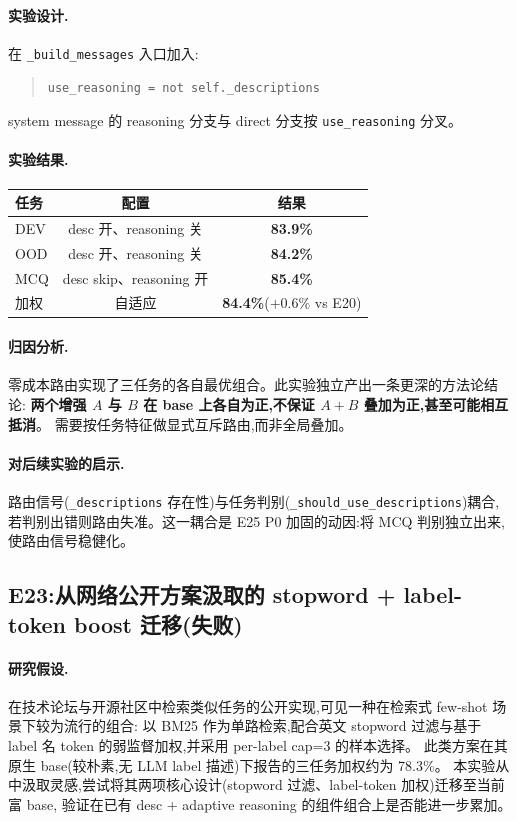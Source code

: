 \documentclass[11pt,a4paper]{ctexart}
\begin{document}
\paragraph{实验设计.}在 \texttt{\_build\_messages} 入口加入:
\begin{quote}
\texttt{use\_reasoning = not self.\_descriptions}
\end{quote}
system message 的 reasoning 分支与 direct 分支按 \texttt{use\_reasoning} 分叉。

\paragraph{实验结果.}

\begin{table}[h]
\centering
\small
\begin{tabular}{lcc}
\toprule
任务 & 配置 & 结果 \\
\midrule
DEV & desc 开、reasoning 关 & \textbf{83.9\%} \\
OOD & desc 开、reasoning 关 & \textbf{84.2\%} \\
MCQ & desc skip、reasoning 开 & \textbf{85.4\%} \\
\midrule
加权 & 自适应 & \textbf{84.4\%}($+0.6\%$ vs E20) \\
\bottomrule
\end{tabular}
\end{table}

\paragraph{归因分析.}零成本路由实现了三任务的各自最优组合。此实验独立产出一条更深的方法论结论:
\textbf{两个增强 $A$ 与 $B$ 在 base 上各自为正,不保证 $A + B$ 叠加为正,甚至可能相互抵消}。
需要按任务特征做显式互斥路由,而非全局叠加。

\paragraph{对后续实验的启示.}路由信号(\texttt{\_descriptions} 存在性)与任务判别(\texttt{\_should\_use\_descriptions})耦合,
若判别出错则路由失准。这一耦合是 E25 P0 加固的动因:将 MCQ 判别独立出来,使路由信号稳健化。

\subsection{E23:从网络公开方案汲取的 stopword + label-token boost 迁移(失败)}

\paragraph{研究假设.}在技术论坛与开源社区中检索类似任务的公开实现,可见一种在检索式 few-shot 场景下较为流行的组合:
以 BM25 作为单路检索,配合英文 stopword 过滤与基于 label 名 token 的弱监督加权,并采用 per-label cap=3 的样本选择。
此类方案在其原生 base(较朴素,无 LLM label 描述)下报告的三任务加权约为 78.3\%。
本实验从中汲取灵感,尝试将其两项核心设计(stopword 过滤、label-token 加权)迁移至当前富 base,
验证在已有 desc + adaptive reasoning 的组件组合上是否能进一步累加。
\end{document}
